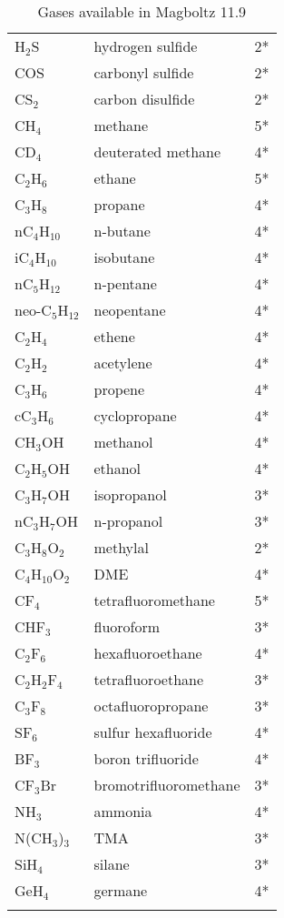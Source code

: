 \begin{appendix}
\begin{longtable}{l l l}
  H\(_{2}\)S & hydrogen sulfide & 2* \\
  COS        & carbonyl sulfide & 2* \\
  CS\(_{2}\) & carbon disulfide & 2* \\
  \midrule
  CH\(_{4}\)           & methane   & 5* \\
  CD\(_{4}\)           & deuterated methane & 4* \\
  C\(_{2}\)H\(_{6}\)   & ethane    & 5* \\
  C\(_{3}\)H\(_{8}\)   & propane   & 4* \\
  nC\(_{4}\)H\(_{10}\) & n-butane  & 4* \\
  iC\(_{4}\)H\(_{10}\) & isobutane & 4* \\ 
  nC\(_{5}\)H\(_{12}\) & n-pentane & 4* \\  
  neo-C\(_{5}\)H\(_{12}\) & neopentane & 4* \\
  C\(_{2}\)H\(_{4}\)   & ethene    & 4* \\
  C\(_{2}\)H\(_{2}\)   & acetylene & 4* \\
  C\(_{3}\)H\(_{6}\)   & propene   & 4* \\
  cC\(_{3}\)H\(_{6}\)   & cyclopropane & 4* \\
  \midrule
  CH\(_{3}\)OH         & methanol        & 4* \\
  C\(_{2}\)H\(_{5}\)OH & ethanol         & 4* \\
  C\(_{3}\)H\(_{7}\)OH & isopropanol     & 3* \\
  nC\(_{3}\)H\(_{7}\)OH & n-propanol     & 3* \\
  C\(_{3}\)H\(_{8}\)O\(_{2}\)  & methylal & 2* \\
  C\(_{4}\)H\(_{10}\)O\(_{2}\) & DME      & 4* \\
  \midrule
  CF\(_{4}\)           & tetrafluoromethane & 5* \\
  CHF\(_{3}\)          & fluoroform         & 3* \\
  C\(_{2}\)F\(_{6}\)   & hexafluoroethane   & 4* \\
  C\(_{2}\)H\(_{2}\)F\(_{4}\) & tetrafluoroethane & 3* \\
  C\(_{3}\)F\(_{8}\)   & octafluoropropane  & 3* \\
  SF\(_{6}\)           & sulfur hexafluoride  & 4* \\
  BF\(_{3}\)           & boron trifluoride    & 4* \\ 
  CF\(_{3}\)Br         & bromotrifluoromethane & 3* \\
  \midrule
  NH\(_{3}\)            & ammonia  & 4* \\
  N(CH\(_{3}\))\(_{3}\) & TMA      & 3* \\
  SiH\(_{4}\)           & silane   & 3* \\
  GeH\(_{4}\)           & germane  & 4* \\
  \bottomrule
  \caption{Gases available in Magboltz 11.9} 
  \label{Tab:GasesMagboltz11}
\end{longtable}

\end{appendix}

